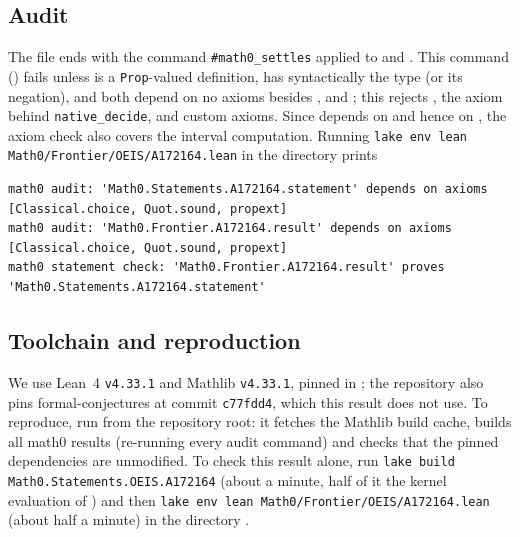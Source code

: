 \documentclass[11pt]{amsart}
\theoremstyle{plain}
\theoremstyle{definition}
\begin{document}
\subsection*{Audit}
The file ends with the command \texttt{\#math0\_settles} applied to  and .
This command () fails unless  is a \texttt{Prop}-valued definition,  has syntactically the type  (or its negation), and both depend on no axioms besides ,  and ; this rejects , the axiom  behind \texttt{native\_decide}, and custom axioms.
Since  depends on  and hence on , the axiom check also covers the interval computation.
Running \texttt{lake env lean Math0/Frontier/OEIS/A172164.lean} in the directory  prints\par\nobreak\noindent
\begin{minipage}{\linewidth}
\begin{lstlisting}[basicstyle=\ttfamily\scriptsize]
math0 audit: 'Math0.Statements.A172164.statement' depends on axioms [Classical.choice, Quot.sound, propext]
math0 audit: 'Math0.Frontier.A172164.result' depends on axioms [Classical.choice, Quot.sound, propext]
math0 statement check: 'Math0.Frontier.A172164.result' proves 'Math0.Statements.A172164.statement'
\end{lstlisting}
\end{minipage}

\subsection*{Toolchain and reproduction}
We use Lean~4 \cite{Lean4} \texttt{v4.33.1} and Mathlib \cite{Mathlib} \texttt{v4.33.1}, pinned in ; the repository also pins formal-conjectures \cite{FC} at commit \texttt{c77fdd4}, which this result does not use.
To reproduce, run  from the repository root: it fetches the Mathlib build cache, builds all math0 results (re-running every audit command) and checks that the pinned dependencies are unmodified.
To check this result alone, run \texttt{lake build Math0.Statements.OEIS.A172164} (about a minute, half of it the kernel evaluation of ) and then \texttt{lake env lean Math0/Frontier/OEIS/A172164.lean} (about half a minute) in the directory .
\end{document}

